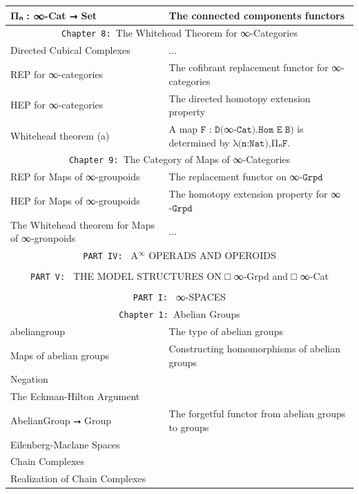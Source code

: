 \documentclass{book}
\theoremstyle{definition}
\begin{document}
{\begin{longtable}{|| l || l ||}
 \hline 
Π⃗ₙ : ∞-Cat ⭢ Set & The connected components functors\\
 \hline \hline
 \multicolumn{2}{||c||}{\texttt{Chapter 8: }The Whitehead Theorem for ∞-Categories} \\
\hline \hline
Directed Cubical Complexes & ...\\
\hline
REP for ∞-categories & The cofibrant replacement functor for ∞-categories\\
\hline
HEP for ∞-categories & The directed homotopy extension property\\
\hline 
Whitehead theorem (a) & A map $\texttt{F : D(}$∞$\texttt{-Cat).Hom E B)}$ is determined by $\texttt{λ(n:Nat),}$Π⃗ₙ$\texttt{F}$.\\
\hline \hline
\multicolumn{2}{||c||}{\texttt{Chapter 9: }The Category of Maps of ∞-Categories} \\
\hline \hline
REP for Maps of ∞-groupoids & The replacement functor on ∞$\texttt{-Grpd}$ \\
\hline
HEP for Maps of ∞-groupoids & The homotopy extension property for ∞$\texttt{-Grpd}$\\
 \hline 
The Whitehead theorem for Maps of ∞-groupoids & ... \\
\hline \hline
 \multicolumn{2}{||c||}{\texttt{PART IV: } A${}^{\infty}$ OPERADS AND OPEROIDS} \\
\hline \hline
 &  \\
\hline \hline
 \multicolumn{2}{||c||}{\texttt{PART V: } THE MODEL STRUCTURES ON □ ∞-Grpd and □ ∞-Cat} \\
\hline \hline
 & \\
\hline \hline
\multicolumn{2}{||c||}{\texttt{PART I: } ∞-SPACES} \\
\hline \hline
 \multicolumn{2}{||c||}{\texttt{Chapter 1: }Abelian Groups} \\
\hline \hline
abeliangroup & The type of abelian groups \\
\hline
Maps of abelian groups & Constructing homomorphisms of abelian groups \\
\hline
Negation & \\
\hline
The Eckman-Hilton Argument & \\
\hline
AbelianGroup ⭢ Group & The forgetful functor from abelian groups to groups \\
\hline
Eilenberg-Maclane Spaces & \\
\hline
Chain Complexes & \\
\hline
Realization of Chain Complexes & \\
\hline

\end{longtable}}
\end{document}
